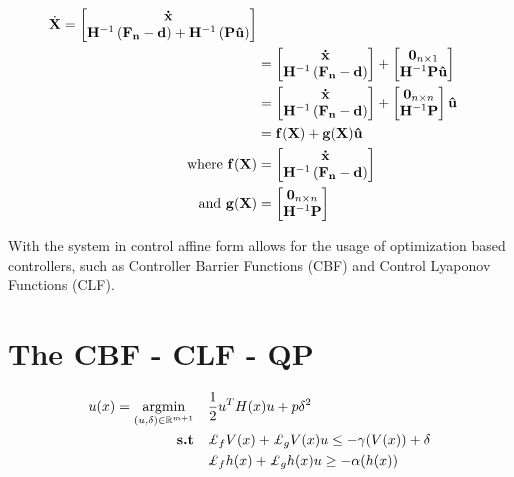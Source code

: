     \begin{align*}
    \dot{\mathbf{X}} =
    \begin{bmatrix}
     {\mathbf{\dot{x}}} \\ {\mathbf{H}} ^{-1}\left ({\mathbf{F_n}}  - {\mathbf{d}} \right ) + {\mathbf{H}} ^{-1}\left ( \mathbf{P}\mathbf{\hat{u}} \right )
    \end{bmatrix} \\ &=
    \begin{bmatrix}
     {\mathbf{\dot{x}}} \\ {\mathbf{H}} ^{-1}\left ({\mathbf{F_n}}  - {\mathbf{d}} \right )
    \end{bmatrix} + \begin{bmatrix}
     {\mathbf{0}}_{n \times 1} \\  {\mathbf{H}} ^{-1} \mathbf{P}\mathbf{\hat{u}}
    \end{bmatrix} \\
    &=
    \begin{bmatrix}
     {\mathbf{\dot{x}}} \\ {\mathbf{H}} ^{-1}\left ({\mathbf{F_n}}  - {\mathbf{d}} \right )
    \end{bmatrix} + \begin{bmatrix}
     {\mathbf{0}}_{n \times n} \\  {\mathbf{H}} ^{-1}\mathbf{P}
    \end{bmatrix}\mathbf{\hat{u}} \\
    &= \mathbf{f}(\mathbf{X}) + \mathbf{g}(\mathbf{X})\mathbf{\hat{u}} \\
    \text{where } \mathbf{f}(\mathbf{X}) &= \begin{bmatrix}
     {\mathbf{\dot{x}}} \\ {\mathbf{H}} ^{-1}\left ({\mathbf{F_n}}  - {\mathbf{d}} \right )
    \end{bmatrix} \\ \text{ and } \mathbf{g}(\mathbf{X}) &= \begin{bmatrix}
     {\mathbf{0}}_{n \times n} \\  {\mathbf{H}} ^{-1}\mathbf{P}
    \end{bmatrix}
\end{align*}


\noindent With the system in control affine form allows for the usage of optimization based controllers, such as Controller Barrier Functions (CBF) and Control Lyaponov Functions (CLF).

\section{The CBF - CLF - QP}

\begin{align} \label{eqn:CBF-CLF-QP}
    u(x) = \argmin_{(u, \delta) \in \mathbb{R}^{m + 1}} \quad &\frac{1}{2}u^TH(x)u + p \delta^2\\
    \textbf{s.t} \quad &\Lie_fV(x) + \Lie_gV(x)u \leq -\gamma(V(x)) + \delta \nonumber\\ &\Lie_fh(x) + \Lie_gh(x)u \geq -\alpha(h(x)) \nonumber
\end{align}

